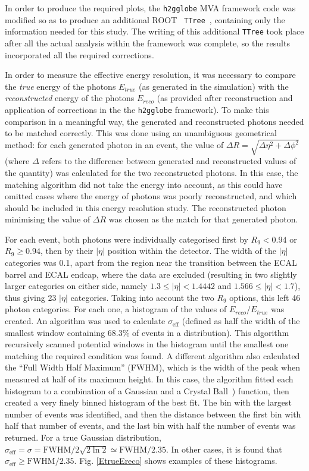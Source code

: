 \documentclass[10pt]{article}
\begin{document}
In order to produce the required plots, the \texttt{h2gglobe} MVA framework code was modified so as to produce an additional ROOT~\cite{root} \texttt{TTree}~\cite{TTree}, containing only the information needed for this study. The writing of this additional \texttt{TTree} took place after all the actual analysis within the framework was complete, so the results incorporated all the required corrections.

In order to measure the effective energy resolution, it was necessary to compare the \textit{true} energy of the photons $E_{true}$ (as generated in the simulation) with the \textit{reconstructed} energy of the photons $E_{reco}$ (as provided after reconstruction and application of corrections in the the \texttt{h2gglobe} framework). To make this comparison in a meaningful way, the generated and reconstructed photons needed to be matched correctly. This was done using an unambiguous geometrical method: for each generated photon in an event, the value of $\Delta R = \sqrt{\Delta \eta^2 + \Delta \phi^2}$ (where $\Delta $ refers to the difference between generated and reconstructed values of the quantity) was calculated for the two reconstructed photons. In this case, the matching algorithm did not take the energy into account, as this could have omitted cases where the energy of photons was poorly reconstructed, and which should be included in this energy resolution study. The reconstructed photon minimising the value of $\Delta R$ was chosen as the match for that generated photon.

For each event, both photons were individually categorised first by $R_{9} <0.94$ or $R_{9} \geq 0.94$, then by their $|\eta|$ position within the detector. The width of the $|\eta|$ categories was 0.1, apart from the region near the transition between the ECAL barrel and ECAL endcap, where the data are excluded (resulting in two slightly larger categories on either side, namely $ 1.3 \leq |\eta| < 1.4442 $ and $1.566 \leq |\eta| < 1.7$), thus giving 23 $|\eta|$ categories. Taking into account the two $R_{9}$ options, this left 46 photon categories. For each one, a histogram of the values of $E_{reco}/E_{true}$ was created. An algorithm was used to calculate $\sigma_{\text{eff}}$ (defined as half the width of the smallest window containing 68.3\% of events in a distribution). This algorithm recursively scanned potential windows in the histogram until the smallest one matching the required condition was found. A different algorithm also calculated the ``Full Width Half Maximum'' (FWHM), which is the width of the peak when measured at half of its maximum height. In this case, the algorithm fitted each histogram to a combination of a Gaussian and a Crystal Ball~\cite{crystalball}) function, then created a very finely binned histogram of the best fit. The bin with the largest number of events was identified, and then the distance between the first bin with half that number of events, and the last bin with half the number of events was returned. For a true Gaussian distribution, $\sigma_{\text{eff}} = \sigma = \text{FWHM}/2\sqrt{2\ln2} \simeq \text{FWHM}/2.35$. In other cases, it is found that $\sigma_{\text{eff}} \geq \text{FWHM}/2.35$. Fig. \ref{EtrueEreco} shows examples of these histograms. 
\end{document}
